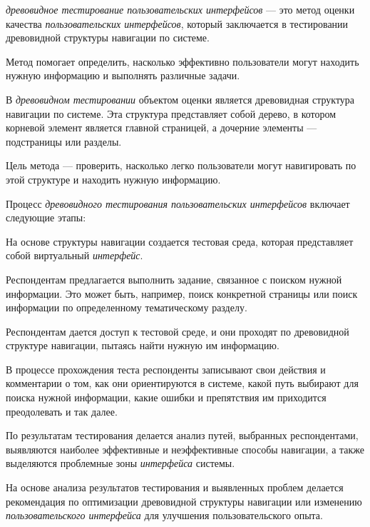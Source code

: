 {\textit{древовидное тестирование пользовательских интерфейсов} --- это метод оценки качества \textit{пользовательских интерфейсов}, который заключается в тестировании древовидной структуры навигации по системе.

Метод помогает определить, насколько эффективно пользователи могут находить нужную информацию и выполнять различные задачи.

В \textit{древовидном тестировании} объектом оценки является древовидная структура навигации по системе. Эта структура представляет собой дерево, в котором корневой элемент является главной страницей, а дочерние элементы --- подстраницы или разделы. 

Цель метода --- проверить, насколько легко пользователи могут навигировать по этой структуре и находить нужную информацию.

Процесс \textit{древовидного тестирования пользовательских интерфейсов} включает следующие этапы:
\begin{textitemize}
	\item На основе структуры навигации создается тестовая среда, которая представляет собой виртуальный \textit{интерфейс}.
	
	\item Респондентам предлагается выполнить задание, связанное с поиском нужной информации. Это может быть, например, поиск конкретной страницы или поиск информации по определенному тематическому разделу.
	
	\item Респондентам дается доступ к тестовой среде, и они проходят по древовидной структуре навигации, пытаясь найти нужную им информацию.
	
	\item В процессе прохождения теста респонденты записывают свои действия и комментарии о том, как они ориентируются в системе, какой путь выбирают для поиска нужной информации, какие ошибки и препятствия им приходится преодолевать и так далее.
	
	\item По результатам тестирования делается анализ путей, выбранных респондентами, выявляются наиболее эффективные и неэффективные способы навигации, а также выделяются проблемные зоны \textit{интерфейса} системы.
	
	\item На основе анализа результатов тестирования и выявленных проблем делается рекомендация по оптимизации древовидной структуры навигации или изменению \textit{пользовательского интерфейса} для улучшения пользовательского опыта.
\end{textitemize}

}
